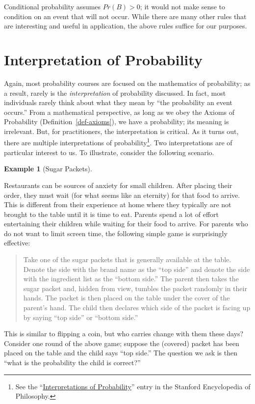 \documentclass[
  letterpaper,
  DIV=11,
  numbers=noendperiod]{scrreprt}
\theoremstyle{definition}
\newtheorem{example}{Example}[chapter]
\theoremstyle{definition}
\theoremstyle{plain}
\theoremstyle{remark}
\begin{document}
Conditional probability assumes \(Pr(B) > 0\); it would not make sense
to condition on an event that will not occur. While there are many other
rules that are interesting and useful in application, the above rules
suffice for our purposes.

\hypertarget{interpretation-of-probability}{%
\section{Interpretation of
Probability}\label{interpretation-of-probability}}

Again, most probability courses are focused on the mathematics of
probability; as a result, rarely is the \emph{interpretation} of
probability discussed. In fact, most individuals rarely think about what
they mean by ``the probability an event occurs.'' From a mathematical
perspective, as long as we obey the Axioms of Probability
(Definition~\ref{def-axioms}), we have a probability; its meaning is
irrelevant. But, for practitioners, the interpretation is critical. As
it turns out, there are multiple interpretations of
probability\footnote{See the
  ``\href{https://plato.stanford.edu/archives/win2012/entries/probability-interpret/\#MaiInt}{Interpretations
  of Probability}'' entry in the Stanford Encyclopedia of Philosophy.}.
Two interpretations are of particular interest to us. To illustrate,
consider the following scenario.

\begin{example}[Sugar
Packets]\protect\hypertarget{exm-sugar}{}\label{exm-sugar}

Restaurants can be sources of anxiety for small children. After placing
their order, they must wait (for what seems like an eternity) for that
food to arrive. This is different from their experience at home where
they typically are not brought to the table until it is time to eat.
Parents spend a lot of effort entertaining their children while waiting
for their food to arrive. For parents who do not want to limit screen
time, the following simple game is surprisingly effective:

\begin{quote}
Take one of the sugar packets that is generally available at the table.
Denote the side with the brand name as the ``top side'' and denote the
side with the ingredient list as the ``bottom side.'' The parent then
takes the sugar packet and, hidden from view, tumbles the packet
randomly in their hands. The packet is then placed on the table under
the cover of the parent's hand. The child then declares which side of
the packet is facing up by saying ``top side'' or ``bottom side.''
\end{quote}

This is similar to flipping a coin, but who carries change with them
these days? Consider one round of the above game; suppose the (covered)
packet has been placed on the table and the child says ``top side.'' The
question we ask is then ``what is the probability the child is
correct?''

\end{example}
\end{document}
